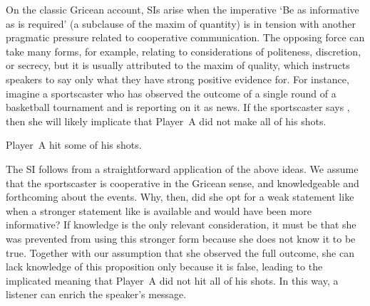 \documentclass[leqno,12pt]{article}
\begin{document}
On the classic Gricean account, SIs arise when the imperative `Be as
informative as is required' (a subclause of the maxim of quantity) is
in tension with another pragmatic pressure related to cooperative
communication. The opposing force can take many forms, for example,
relating to considerations of politeness, discretion, or secrecy, but
it is usually attributed to the maxim of quality, which instructs
speakers to say only what they have strong positive evidence for. For
instance, imagine a sportscaster who has observed the outcome of a
single round of a basketball tournament and is reporting on it as
news. If the sportscaster says , then she will likely
implicate that Player~A did not make all of his shots.
%
\begin{examples}
\item\label{some} Player~A hit some of his shots.
\end{examples}

The SI follows from a straightforward application of the above
ideas. We assume that the sportscaster is cooperative in the Gricean
sense, and knowledgeable and forthcoming about the events. Why, then,
did she opt for a weak statement like  when a stronger statement like  is available and would have been more informative?  If
knowledge is the only relevant consideration, it must be that she was
prevented from using this stronger form because she does not know it
to be true. Together with our assumption that she observed the full
outcome, she can lack knowledge of this proposition only because it is
false, leading to the implicated meaning that Player~A did not hit all
of his shots. In this way, a listener can enrich the speaker's
message.
\end{document}
